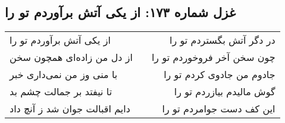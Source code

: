 \begin{center}
\section*{غزل شماره ۱۷۳: از یکی آتش برآوردم تو را}
\label{sec:0173}
\begin{longtable}{l p{0.5cm} r}
از یکی آتش برآوردم تو را
&&
در دگر آتش بگستردم تو را
\\
از دل من زاده‌ای همچون سخن
&&
چون سخن آخر فروخوردم تو را
\\
با منی وز من نمی‌داری خبر
&&
جادوم من جادوی کردم تو را
\\
تا نیفتد بر جمالت چشم بد
&&
گوش مالیدم بیازردم تو را
\\
دایم اقبالت جوان شد ز آنچ داد
&&
این کف دست جوامردم تو را
\\
\end{longtable}
\end{center}
